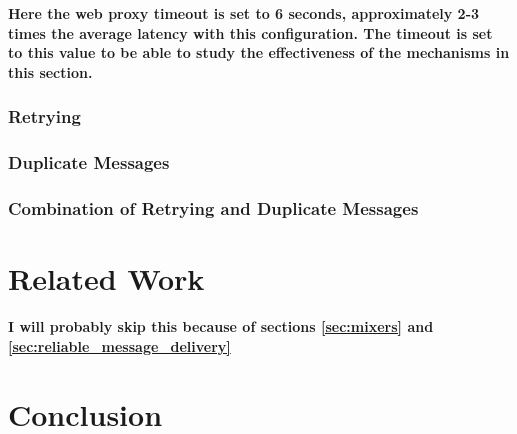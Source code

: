 \documentclass[a4paper,11pt,oneside]{report}
\begin{document}
\textbf{Here the web proxy timeout is set to 6 seconds, approximately 2-3 times the average latency with this configuration. The timeout is set to this value to be able to study the effectiveness of the mechanisms in this section.}
\subsection{Retrying}

\subsection{Duplicate Messages}

\subsection{Combination of Retrying and Duplicate Messages}

\chapter{Related Work}



\textbf{I will probably skip this because of sections \autoref{sec:mixers} and \autoref{sec:reliable_message_delivery}}

\chapter{Conclusion}


\cleardoublepage
{}
{}
\printbibliography

%
%
\end{document}
